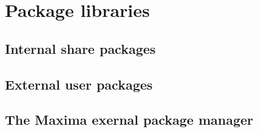 \documentclass[../Maxima_Workbook.tex]{subfiles}
\begin{document}
	
\chapter{Package libraries}

\section{Internal share packages}

\section{External user packages}

\section{The Maxima exernal package manager}
\end{document}
